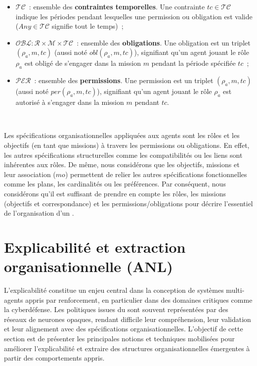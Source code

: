 \begin{itemize}
  \item $\mathcal{TC}$~: ensemble des \textbf{contraintes temporelles}. Une contrainte $tc \in \mathcal{TC}$ indique les périodes pendant lesquelles une permission ou obligation est valide ($Any \in \mathcal{TC}$ signifie tout le temps)~;
  \item $\mathcal{OBL}: \mathcal{R} \times \mathcal{M} \times \mathcal{TC}$~: ensemble des \textbf{obligations}. Une obligation est un triplet $(\rho_a, m, tc)$ (aussi noté $obl(\rho_a, m, tc)$), signifiant qu'un agent jouant le rôle $\rho_a$ est obligé de s'engager dans la mission $m$ pendant la période spécifiée $tc$~;
  \item $\mathcal{PER}$~: ensemble des \textbf{permissions}. Une permission est un triplet $(\rho_a, m, tc)$ (aussi noté $per(\rho_a, m, tc)$), signifiant qu'un agent jouant le rôle $\rho_a$ est autorisé à s'engager dans la mission $m$ pendant $tc$.
\end{itemize}

\

\noindent Les spécifications organisationnelles appliquées aux agents sont les rôles et les objectifs (en tant que missions) à travers les permissions ou obligations. En effet, les autres spécifications structurelles comme les compatibilités ou les liens sont inhérentes aux rôles. De même, nous considérons que les objectifs, missions et leur association ($mo$) permettent de relier les autres spécifications fonctionnelles comme les plans, les cardinalités ou les préférences.
Par conséquent, nous considérons qu'il est suffisant de prendre en compte les rôles, les missions (objectifs et correspondance) et les permissions/obligations pour décrire l'essentiel de l'organisation d'un .


\section{Explicabilité et extraction organisationnelle (ANL)}

\noindent
L’explicabilité constitue un enjeu central dans la conception de systèmes multi-agents
appris par renforcement, en particulier dans des domaines critiques comme la cyberdéfense.
Les politiques issues du  sont souvent représentées par des réseaux de neurones
opaques, rendant difficile leur compréhension, leur validation et leur alignement
avec des spécifications organisationnelles.
L’objectif de cette section est de présenter les principales notions et techniques
mobilisées pour améliorer l’explicabilité et extraire des structures organisationnelles
émergentes à partir des comportements appris.

